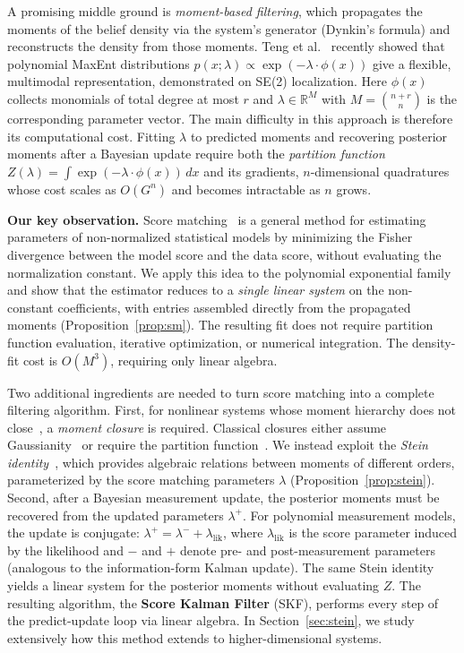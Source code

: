 \documentclass{article}
\newcommand{\R}{\mathbb{R}}
\theoremstyle{definition}
\begin{document}
A promising middle ground is \emph{moment-based filtering}, which
propagates the moments of the belief density via the system's generator
(Dynkin's formula) and reconstructs the density from those moments.
Teng et al.~\cite{teng2025} recently showed that polynomial MaxEnt
distributions $p(x;\lambda) \propto \exp(-\lambda \cdot \phi(x))$
give a flexible, multimodal representation, demonstrated on SE(2)
localization. Here $\phi(x)$ collects monomials of total degree at most
$r$ and $\lambda \in \R^M$ with $M = \binom{n+r}{n}$ is the
corresponding parameter vector.
The main difficulty in this approach is therefore its computational cost. Fitting $\lambda$ to predicted
moments and recovering posterior moments after a Bayesian update require both
the \emph{partition function}
$Z(\lambda) = \int \exp(-\lambda\cdot\phi(x))\,dx$ and its gradients,
$n$-dimensional quadratures whose cost scales as $O(G^n)$ and becomes
intractable as $n$ grows.

\textbf{Our key observation.}
Score matching~\cite{hyvarinen2005} is a general method for estimating
parameters of non-normalized statistical models by minimizing the
Fisher divergence between the model score and the data score, without
evaluating the normalization constant.
We apply this idea to the polynomial exponential family and show that
the estimator reduces to a \emph{single linear system} on the non-constant
coefficients, with entries assembled directly from the propagated moments
(Proposition~\ref{prop:sm}).
The resulting fit does not require partition function evaluation,
iterative optimization, or numerical integration.
The density-fit cost is $O(M^3)$, requiring only linear algebra.

Two additional ingredients are needed to turn score matching into a
complete filtering algorithm.
First, for nonlinear systems whose moment hierarchy does not close~\cite{kuehn2016}, a \emph{moment closure} is required.
Classical closures either assume Gaussianity~\cite{whittle1957}
or require the partition function~\cite{levermore1996,singh2011}.
We instead exploit the \emph{Stein identity}~\cite{kume2026},
which provides algebraic relations between moments of different orders,
parameterized by the score matching parameters $\lambda$
(Proposition~\ref{prop:stein}).
Second, after a Bayesian measurement update, the posterior moments must
be recovered from the updated parameters $\lambda^+$.
For polynomial measurement models, the update is conjugate:
$\lambda^+ = \lambda^- + \lambda_{\mathrm{lik}}$,
where $\lambda_{\mathrm{lik}}$ is the score parameter induced by the
likelihood and $-$ and $+$ denote pre- and post-measurement parameters
(analogous to the information-form Kalman update). The same
Stein identity yields a linear system for the posterior moments without
evaluating $Z$.
The resulting algorithm, the \textbf{Score Kalman Filter} (SKF),
performs every step of the predict-update loop via linear algebra.
In Section~\ref{sec:stein}, we study extensively how this method extends to higher-dimensional
systems.
\end{document}
